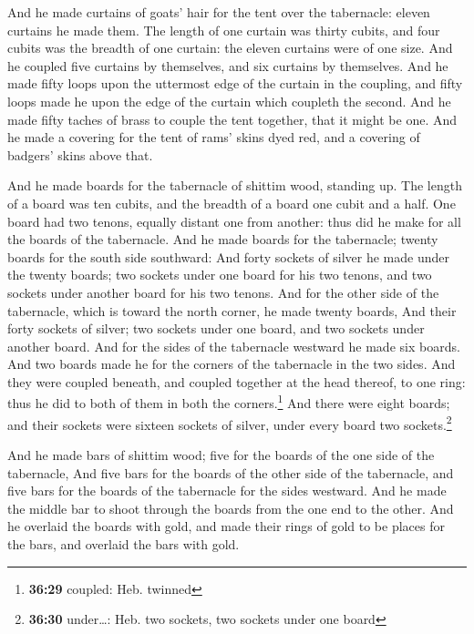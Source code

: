  And he made curtains of goats' hair for the tent over
the tabernacle: eleven curtains he made them.  The length
of one curtain was thirty cubits, and four cubits was the breadth of one
curtain: the eleven curtains were of one size.  And he
coupled five curtains by themselves, and six curtains by themselves.
 And he made fifty loops upon the uttermost edge of the
curtain in the coupling, and fifty loops made he upon the edge of the
curtain which coupleth the second.  And he made fifty
taches of brass to couple the tent together, that it might be one.
 And he made a covering for the tent of rams' skins dyed
red, and a covering of badgers' skins above that.

 And he made boards for the tabernacle of shittim wood,
standing up.  The length of a board was ten cubits, and
the breadth of a board one cubit and a half.  One board
had two tenons, equally distant one from another: thus did he make for
all the boards of the tabernacle.  And he made boards for
the tabernacle; twenty boards for the south side southward:
 And forty sockets of silver he made under the twenty
boards; two sockets under one board for his two tenons, and two sockets
under another board for his two tenons.  And for the
other side of the tabernacle, which is toward the north corner, he made
twenty boards,  And their forty sockets of silver; two
sockets under one board, and two sockets under another board.
 And for the sides of the tabernacle westward he made six
boards.  And two boards made he for the corners of the
tabernacle in the two sides.  And they were coupled
beneath, and coupled together at the head thereof, to one ring: thus he
did to both of them in both the corners.\footnote{\textbf{36:29}
  coupled: Heb. twinned}  And there were eight boards;
and their sockets were sixteen sockets of silver, under every board two
sockets.\footnote{\textbf{36:30} under\ldots: Heb. two sockets, two
  sockets under one board}

 And he made bars of shittim wood; five for the boards of
the one side of the tabernacle,  And five bars for the
boards of the other side of the tabernacle, and five bars for the boards
of the tabernacle for the sides westward.  And he made
the middle bar to shoot through the boards from the one end to the
other.  And he overlaid the boards with gold, and made
their rings of gold to be places for the bars, and overlaid the bars
with gold.

